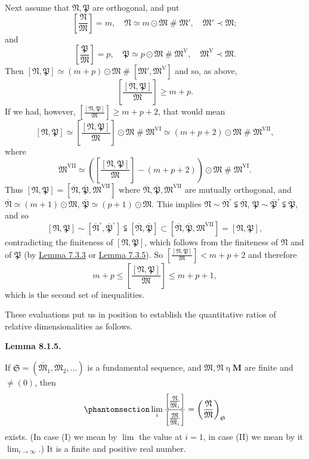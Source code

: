 \documentclass[12pt,b5paper,twoside]{article}
\newcommand{\M}{\mathbf M}
\newcommand{\reldiv}[2]{\left[\frac{#1}{#2}\right]}
\newcommand{\Lemma}[1]{%
  \par\smallskip\noindent\phantomsection\label{lem:#1}\textbf{Lemma #1.}\enspace
}
\newcommand{\lemref}[1]{\hyperref[lem:#1]{Lemma #1}}
\begin{document}
Next assume that $\mathfrak N,\mathfrak P$ are orthogonal, and put
\[
 \reldiv{\mathfrak N}{\mathfrak M}=m,
 \quad \mathfrak N\simeq m\odot\mathfrak M\mathbin{\#}\mathfrak M',
 \quad \mathfrak M'\prec\mathfrak M;
\]
and
\[
 \reldiv{\mathfrak P}{\mathfrak M}=p,
 \quad \mathfrak P\simeq p\odot\mathfrak M\mathbin{\#}\mathfrak M^{\mathrm V},
 \quad \mathfrak M^{\mathrm V}\prec\mathfrak M.
\]
Then
$[\mathfrak N,\mathfrak P]\simeq(m+p)\odot\mathfrak M
\mathbin{\#}[\mathfrak M',\mathfrak M^{\mathrm V}]$ and so, as above,
\[
 \reldiv{[\mathfrak N,\mathfrak P]}{\mathfrak M}\geq m+p.
\]
If we had, however,
$\reldiv{[\mathfrak N,\mathfrak P]}{\mathfrak M}\geq m+p+2$, that would mean
\[
 [\mathfrak N,\mathfrak P]\simeq
 \reldiv{[\mathfrak N,\mathfrak P]}{\mathfrak M}\odot\mathfrak M
 \mathbin{\#}\mathfrak M^{\mathrm{VI}}
 \simeq(m+p+2)\odot\mathfrak M\mathbin{\#}\mathfrak M^{\mathrm{VII}},
\]
where
\[
 \mathfrak M^{\mathrm{VII}}\simeq
 \left(\reldiv{[\mathfrak N,\mathfrak P]}{\mathfrak M}-(m+p+2)\right)
 \odot\mathfrak M\mathbin{\#}\mathfrak M^{\mathrm{VI}}.
\]
Thus
$[\mathfrak N,\mathfrak P]=[\overline{\mathfrak N},
\overline{\mathfrak P},\mathfrak M^{\mathrm{VII}}]$ where
$\overline{\mathfrak N},\overline{\mathfrak P},\mathfrak M^{\mathrm{VII}}$
are mutually orthogonal, and
$\overline{\mathfrak N}\simeq(m+1)\odot\mathfrak M$,
$\overline{\mathfrak P}\simeq(p+1)\odot\mathfrak M$. This implies
$\mathfrak N\sim\overline{\mathfrak N}^{\circ}
\subsetneqq\overline{\mathfrak N}$,
$\mathfrak P\sim\overline{\mathfrak P}^{\circ}
\subsetneqq\overline{\mathfrak P}$, and so
\[
 [\mathfrak N,\mathfrak P]
 \sim[\overline{\mathfrak N}^{\circ},\overline{\mathfrak P}^{\circ}]
 \subsetneqq[\overline{\mathfrak N},\overline{\mathfrak P}]
 \subset[\overline{\mathfrak N},\overline{\mathfrak P},
 \mathfrak M^{\mathrm{VII}}]=[\mathfrak N,\mathfrak P],
\]
contradicting the finiteness of $[\mathfrak N,\mathfrak P]$, which follows from
the finiteness of $\mathfrak N$ and of $\mathfrak P$ (by \lemref{7.3.3} or
\lemref{7.3.5}). So
$\reldiv{[\mathfrak N,\mathfrak P]}{\mathfrak M}<m+p+2$ and therefore
\[
 m+p\leq\reldiv{[\mathfrak N,\mathfrak P]}{\mathfrak M}\leq m+p+1,
\]
which is the second set of inequalities.

These evaluations put us in position to establish the quantitative ratios of
relative dimensionalities as follows.

\Lemma{8.1.5}
If $\mathfrak S=(\overline{\mathfrak M}_1,\overline{\mathfrak M}_2,\ldots)$
is a fundamental sequence, and $\mathfrak M,\mathfrak N\mathbin\eta\M$ are
finite and $\ne(0)$, then
\begin{equation*}
 \phantomsection\label{eq:8.1.1}
 \lim_i
 \frac{\reldiv{\mathfrak N}{\overline{\mathfrak M}_i}}
      {\reldiv{\mathfrak M}{\overline{\mathfrak M}_i}}
 =\left(\frac{\mathfrak N}{\mathfrak M}\right)_{\mathfrak S}
\end{equation*}
exists. (In case (I) we mean by $\lim$ the value at $i=1$, in case (II) we mean
by it $\lim_{i\to\infty}$.) It is a finite and positive real number.
\end{document}
